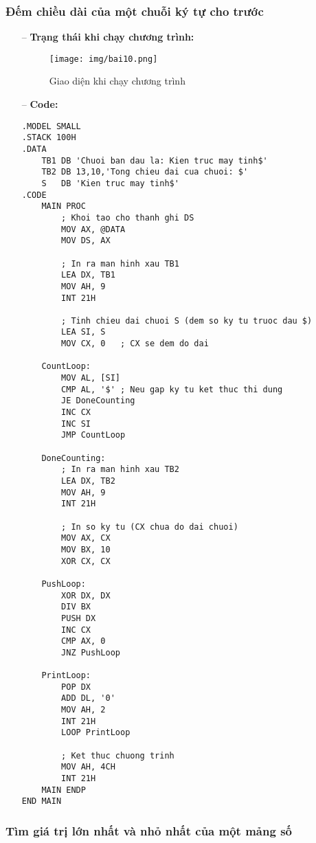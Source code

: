 \documentclass{article}
\begin{document}
\subsubsection{Đếm chiều dài của một chuỗi ký tự cho trước}

\begin{itemize}
\item[--]\textbf{Trạng thái khi chạy chương trình:}

\begin{figure}[H]
    \centering
    \texttt{[image: img/bai10.png]}
    \caption{Giao diện khi chạy chương trình}
    \label{fig:before_input}
\end{figure}
\newpage
\item[--]\textbf{Code:}
\begin{lstlisting}[caption={Đếm chiều dài của một chuỗi ký tự cho trước}]
.MODEL SMALL
.STACK 100H
.DATA
    TB1 DB 'Chuoi ban dau la: Kien truc may tinh$'
    TB2 DB 13,10,'Tong chieu dai cua chuoi: $'
    S   DB 'Kien truc may tinh$'
.CODE
    MAIN PROC
        ; Khoi tao cho thanh ghi DS
        MOV AX, @DATA
        MOV DS, AX
    
        ; In ra man hinh xau TB1
        LEA DX, TB1
        MOV AH, 9
        INT 21H
        
        ; Tinh chieu dai chuoi S (dem so ky tu truoc dau $)
        LEA SI, S
        MOV CX, 0   ; CX se dem do dai
    
    CountLoop:
        MOV AL, [SI]
        CMP AL, '$' ; Neu gap ky tu ket thuc thi dung
        JE DoneCounting
        INC CX
        INC SI
        JMP CountLoop
    
    DoneCounting:
        ; In ra man hinh xau TB2
        LEA DX, TB2
        MOV AH, 9
        INT 21H
    
        ; In so ky tu (CX chua do dai chuoi)
        MOV AX, CX
        MOV BX, 10
        XOR CX, CX
    
    PushLoop:
        XOR DX, DX
        DIV BX
        PUSH DX
        INC CX
        CMP AX, 0
        JNZ PushLoop
    
    PrintLoop:
        POP DX
        ADD DL, '0'
        MOV AH, 2
        INT 21H
        LOOP PrintLoop
    
        ; Ket thuc chuong trinh
        MOV AH, 4CH
        INT 21H
    MAIN ENDP
END MAIN
\end{lstlisting}
\end{itemize}
\newpage

\subsubsection{Tìm giá trị lớn nhất và nhỏ nhất của một mảng số}
\end{document}
